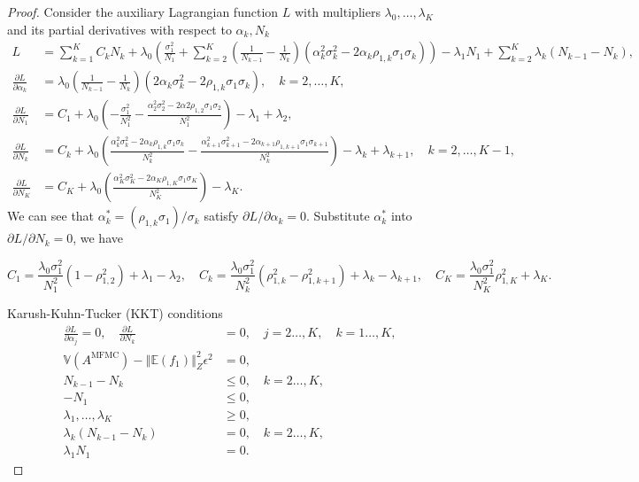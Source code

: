 \documentclass[final,3p,times,11pt]{elsarticle}
\begin{document}
\begin{proof}
Consider the auxiliary Lagrangian function $L$ with multipliers $\lambda_0,\ldots, \lambda_K$
and its partial derivatives with respect to $\alpha_k,N_k$
\begin{align*}
    L &= \sum_{k=1}^K C_kN_k +\lambda_0 \left(\frac{\sigma_1^2}{N_1} + \sum_{k=2}^K \left(\frac{1}{N_{k-1}} - \frac{1}{N_k}\right)\left(\alpha_k^2\sigma_k^2 - 2\alpha_k\rho_{1,k}\sigma_1\sigma_k\right)\right)-\lambda_1 N_1+\sum_{k=2}^K\lambda_k(N_{k-1} - N_k),\\
    \frac{\partial L}{\partial \alpha_k}&=\lambda_0\left(\frac{1}{N_{k-1}} - \frac{1}{N_k}\right)\left(2\alpha_k\sigma_k^2 - 2\rho_{1,k}\sigma_1\sigma_k\right),\quad k=2,\dots,K,\\
    \frac{\partial L}{\partial N_1}&=C_1 + \lambda_0\left(-\frac{\sigma_1^2}{N_1^2} - \frac{\alpha_2^2\sigma_2^2-2\alpha2\rho_{1,2}\sigma_1\sigma_2}{N_1^2}\right)-\lambda_1+\lambda_2,\\
    \frac{\partial L}{\partial N_k}&=C_k+\lambda_0\left(\frac{\alpha_k^2\sigma_k^2 - 2\alpha_k\rho_{1,k}\sigma_1\sigma_k}{N_k^2}-\frac{\alpha_{k+1}^2\sigma_{k+1}^2 - 2\alpha_{k+1}\rho_{1,k+1}\sigma_1\sigma_{k+1}}{N_k^2}\right)-\lambda_k+\lambda_{k+1}, \quad k=2,\dots,K-1,\\
    \frac{\partial L}{\partial N_K}&=C_K + \lambda_0\left(\frac{\alpha_K^2\sigma_K^2 - 2\alpha_K\rho_{1,K}\sigma_1\sigma_K}{N_K^2}\right)-\lambda_K.
\end{align*}
We can see that $\alpha_k^*=(\rho_{1,k}\sigma_1)/\sigma_k$ satisfy $\partial L/\partial \alpha_k=0$. Substitute $\alpha_k^*$ into $\partial L/\partial N_k=0$, we have

\begin{equation*}
    C_1=\frac{\lambda_0\sigma_1^2}{N_1^2}\left(1-\rho_{1,2}^2\right)+\lambda_1-\lambda_2,\quad C_k=\frac{\lambda_0\sigma_1^2}{N_k^2}\left(\rho_{1,k}^2-\rho_{1,k+1}^2\right)+\lambda_k-\lambda_{k+1},\quad C_K=\frac{\lambda_0\sigma_1^2}{N_K^2}\rho_{1,K}^2+\lambda_K.
\end{equation*}

Karush-Kuhn-Tucker (KKT) conditions
\begin{align*}
\frac{\partial L}{\partial \alpha_j}=0,\quad \frac{\partial L}{\partial N_k}&=0,\quad j=2\ldots,K, \quad k=1\ldots,K,\\
\mathbb{V}\left(A^{\text{MFMC}}\right)- \left\Vert\mathbb{E}(f_1) \right\Vert_{Z}^2\epsilon^2 &= 0,\\
    N_{k-1}-N_k&\le 0, \quad k=2\ldots,K,\\
    -N_1&\le 0,\\[6pt]
    \lambda_1,\ldots,\lambda_K &\ge 0,\\
    \lambda_k(N_{k-1}-N_k)&=0,\quad k=2\ldots,K,\\
    \lambda_1 N_1&=0.
\end{align*}



\end{proof}
\end{document}
